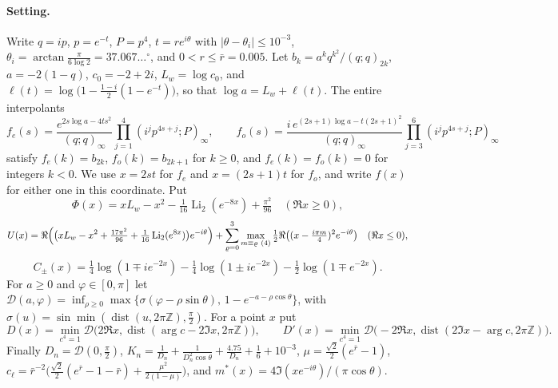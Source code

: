 
\paragraph{Setting.} Write $q=ip$, $p=e^{-t}$, $P=p^4$, $t=re^{i\theta}$ with
$|\theta-\theta_i|\le10^{-3}$, $\theta_i=\arctan\frac{\pi}{6\log2}=37.067\ldots^\circ$, and
$0<r\le\bar r=0.005$. Let $b_k=a^kq^{k^2}/(q;q)_{2k}$, $a=-2(1-q)$, $c_0=-2+2i$, $L_w=\log c_0$, and
$\ell(t)=\log\bigl(1-\tfrac{1-i}{2}(1-e^{-t})\bigr)$, so that $\log a=L_w+\ell(t)$. The entire interpolants
\[
 f_e(s)=\frac{e^{2s\log a-4ts^2}}{(q;q)_\infty}\prod_{j=1}^{4}(i^jp^{4s+j};P)_\infty,\qquad
 f_o(s)=\frac{i\,e^{(2s+1)\log a-t(2s+1)^2}}{(q;q)_\infty}\prod_{j=3}^{6}(i^jp^{4s+j};P)_\infty
\]
satisfy $f_e(k)=b_{2k}$, $f_o(k)=b_{2k+1}$ for $k\ge0$, and $f_e(k)=f_o(k)=0$ for integers $k<0$. We use
$x=2st$ for $f_e$ and $x=(2s+1)t$ for $f_o$, and write $f(x)$ for either one in this coordinate. Put
\[
 \Phi(x)=xL_w-x^2-\tfrac1{16}\operatorname{Li}_2(e^{-8x})+\tfrac{\pi^2}{96}\quad(\Re x\ge0),
\]
\[
 U(x)=\Re\Bigl(\bigl(xL_w-x^2+\tfrac{17\pi^2}{96}+\tfrac1{16}\operatorname{Li}_2(e^{8x})\bigr)e^{-i\theta}\Bigr)
  +\sum_{\varrho=0}^{3}\max_{m\equiv\varrho\ (4)}\tfrac12\Re\bigl((x-\tfrac{i\pi m}4)^2e^{-i\theta}\bigr)
  \quad(\Re x\le0),
\]
\[
 C_\pm(x)=\tfrac14\log(1\mp ie^{-2x})-\tfrac14\log(1\pm ie^{-2x})-\tfrac12\log(1\mp e^{-2x}).
\]
For $a\ge0$ and $\varphi\in[0,\pi]$ let
$\mathcal D(a,\varphi)=\inf_{\rho\ge0}\max\bigl\{\sigma(\varphi-\rho\sin\theta),\,1-e^{-a-\rho\cos\theta}\bigr\}$,
with $\sigma(u)=\sin\min(\operatorname{dist}(u,2\pi\mathbb Z),\frac\pi2)$. For a point $x$ put
\[
 D(x)=\min_{c^4=1}\mathcal D\bigl(2\Re x,\operatorname{dist}(\arg c-2\Im x,2\pi\mathbb Z)\bigr),\qquad
 D'(x)=\min_{c^4=1}\mathcal D\bigl(-2\Re x,\operatorname{dist}(2\Im x-\arg c,2\pi\mathbb Z)\bigr).
\]
Finally $D_n=\mathcal D(0,\frac\pi2)$,
$K_n=\frac1{D_n}+\frac1{D_n^2\cos\theta}+\frac{4.75}{D_n}+\frac16+10^{-3}$,
$\mu=\frac{\sqrt2}2(e^{\bar r}-1)$, $c_\ell=\bar r^{-2}\bigl(\frac{\sqrt2}2(e^{\bar r}-1-\bar r)+\frac{\mu^2}{2(1-\mu)}\bigr)$, and
$m^\ast(x)=4\Im(xe^{-i\theta})/(\pi\cos\theta)$.

